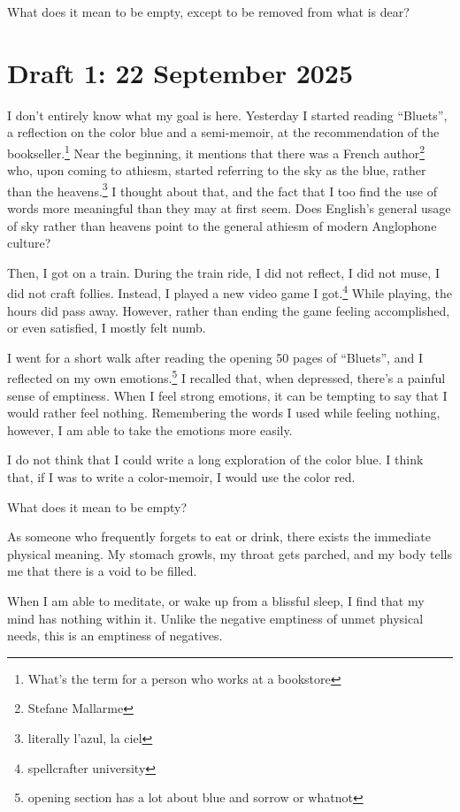 \documentclass[12pt]{article}
\newcommand{\say}[1]{``#1''}
\renewcommand{\,}{\textsuperscript{,}}
\begin{document}
What does it mean to be empty, except to be removed from what is dear?

\section{Draft 1: 22 September 2025}
I don't entirely know what my goal is here.
Yesterday I started reading \say{Bluets}, a reflection on the color blue and a semi-memoir, at the recommendation of the bookseller.\footnote{What's the term for a person who works at a bookstore}
Near the beginning, it mentions that there was a French author\footnote{Stefane Mallarme} who, upon coming to athiesm, started referring to the sky as the blue, rather than the heavens.\footnote{literally l'azul, la ciel}
I thought about that, and the fact that I too find the use of words more meaningful than they may at first seem.
Does English's general usage of sky rather than heavens point to the general athiesm of modern Anglophone culture?

Then, I got on a train.
During the train ride, I did not reflect, I did not muse, I did not craft follies.
Instead, I played a new video game I got.\footnote{spellcrafter university}
While playing, the hours did pass away.
However, rather than ending the game feeling accomplished, or even satisfied, I mostly felt numb.

I went for a short walk after reading the opening 50 pages of \say{Bluets}, and I reflected on my own emotions.\footnote{opening section has a lot about blue and sorrow or whatnot}
I recalled that, when depressed, there's a painful sense of emptiness.
When I feel strong emotions, it can be tempting to say that I would rather feel nothing.
Remembering the words I used while feeling nothing, however, I am able to take the emotions more easily.

I do not think that I could write a long exploration of the color blue.
I think that, if I was to write a color-memoir, I would use the color red.

What does it mean to be empty?

As someone who frequently forgets to eat or drink, there exists the immediate physical meaning.
My stomach growls, my throat gets parched, and my body tells me that there is a void to be filled.

When I am able to meditate, or wake up from a blissful sleep, I find that my mind has nothing within it.
Unlike the negative emptiness of unmet physical needs, this is an emptiness of negatives.
\end{document}
